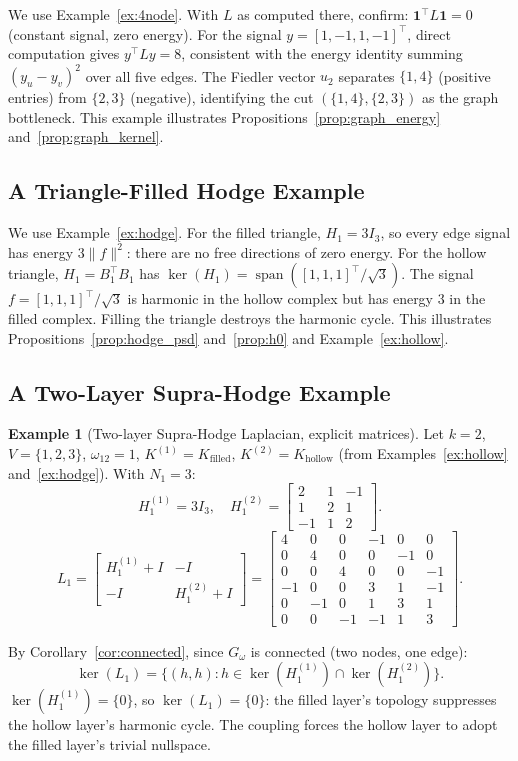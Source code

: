 \documentclass[11pt]{article}
\theoremstyle{definition}
\newtheorem{example}[theorem]{Example}
\theoremstyle{remark}
\newcommand{\Gom}{G_\omega}
\DeclareMathOperator{\spn}{span}
\begin{document}
We use Example~\ref{ex:4node}. With $L$ as computed there, confirm:
$\mathbf{1}^\top L\mathbf{1}=0$ (constant signal, zero energy). For the signal
$y=[1,-1,1,-1]^\top$, direct computation gives $y^\top Ly = 8$, consistent
with the energy identity summing $(y_u-y_v)^2$ over all five edges. The Fiedler
vector $u_2$ separates $\{1,4\}$ (positive entries) from $\{2,3\}$ (negative),
identifying the cut $(\{1,4\},\{2,3\})$ as the graph bottleneck. This example
illustrates Propositions~\ref{prop:graph_energy} and~\ref{prop:graph_kernel}.

\subsection{A Triangle-Filled Hodge Example}

We use Example~\ref{ex:hodge}. For the filled triangle, $H_1=3I_3$, so every
edge signal has energy $3\|f\|^2$: there are no free directions of zero energy.
For the hollow triangle, $H_1=B_1^\top B_1$ has $\ker(H_1)=\spn([1,1,1]^\top/
\sqrt{3})$. The signal $f=[1,1,1]^\top/\sqrt{3}$ is harmonic in the hollow
complex but has energy $3$ in the filled complex. Filling the triangle destroys
the harmonic cycle. This illustrates Propositions~\ref{prop:hodge_psd}
and~\ref{prop:h0} and Example~\ref{ex:hollow}.

\subsection{A Two-Layer Supra-Hodge Example}

\begin{example}[Two-layer Supra-Hodge Laplacian, explicit matrices]
\label{ex:sh_main}
Let $k=2$, $V=\{1,2,3\}$, $\omega_{12}=1$, $K^{(1)}=K_{\mathrm{filled}}$,
$K^{(2)}=K_{\mathrm{hollow}}$ (from Examples~\ref{ex:hollow}
and~\ref{ex:hodge}). With $N_1=3$:
\[
  H_1^{(1)} = 3I_3,\quad
  H_1^{(2)} = \begin{bmatrix}2&1&-1\\1&2&1\\-1&1&2\end{bmatrix}.
\]
\[
  L_1 =
  \begin{bmatrix}
    H_1^{(1)}+I & -I\\
    -I & H_1^{(2)}+I
  \end{bmatrix}
  =
  \begin{bmatrix}
    4 & 0 & 0 & -1 & 0 & 0\\
    0 & 4 & 0 & 0 & -1 & 0\\
    0 & 0 & 4 & 0 & 0 & -1\\
    -1& 0 & 0 & 3 & 1 & -1\\
    0 &-1 & 0 & 1 & 3 & 1\\
    0 & 0 &-1 &-1 & 1 & 3
  \end{bmatrix}.
\]

By Corollary~\ref{cor:connected}, since $\Gom$ is connected (two nodes, one
edge):
\[
  \ker(L_1) = \{(h,h):h\in\ker(H_1^{(1)})\cap\ker(H_1^{(2)})\}.
\]
$\ker(H_1^{(1)})=\{0\}$, so $\ker(L_1)=\{0\}$: the filled layer's topology
suppresses the hollow layer's harmonic cycle. The coupling forces the hollow
layer to adopt the filled layer's trivial nullspace.
\end{example}
\end{document}

